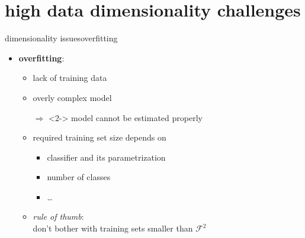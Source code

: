     \section[challenges]{high data dimensionality challenges}
		\begin{frame}{dimensionality issues}{overfitting}
            \begin{itemize}
                \item   \textbf{overfitting}:
                    \begin{itemize}
                        \item   lack of training data
                        \item   overly complex model
                        \item[$\Rightarrow$]<2-> model cannot be estimated properly
                    \end{itemize}
                    
                    \bigskip
                    \begin{itemize}
                        \item<3-> required training set size depends on 
                            \begin{itemize}
                                \item   classifier and its parametrization
                                \item   number of classes
                                \item   \ldots
                            \end{itemize}
                        \bigskip
                        \item<3-> \textit{rule of thumb}:\\ don't bother with training sets smaller than $\mathcal{F}^2$
                    \end{itemize}
                    \vspace{50mm}
			\end{itemize}
		\end{frame}
